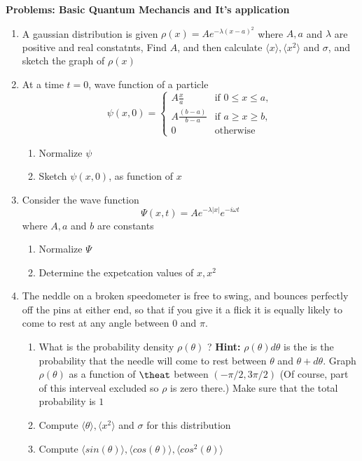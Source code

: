 \documentclass{article}[12pt, a4paper]
\begin{document}
\begin{center}
	\textbf{Problems: Basic Quantum Mechancis and It's application}
\end{center}
\begin{enumerate}

\item A gaussian distribution is given $\rho(x) = A e^{-\lambda (x - a)^2}$ where $A, a$ and $\lambda$ are positive and real constatnts, Find $A$, and then calculate $\langle x \rangle, \langle x^2 \rangle $ and $\sigma$, and sketch the graph of $\rho (x)$

\item At a time $t = 0$, wave function of a particle
$$
\psi (x, 0) =
\begin{cases}
	A \frac{x}{a} & \text{if } 0 \le x \le a, \\
	A \frac{(b - a)}{b - a} & \text{if } a \ge x \ge b, \\
	0 & \text{otherwise}

\end{cases}$$
\begin{enumerate}
	\item Normalize $\psi$
	\item Sketch $\psi(x, 0)$, as function of $x$
\end{enumerate}

\item Consider the wave function $$\Psi(x,t) = Ae^{-\lambda |x|}e^{-i\omega t}$$
where $A, a$ and $b$ are constants
\begin{enumerate}
	\item Normalize $\Psi$
	\item Determine the expetcation values of $x, x^2$
\end{enumerate}

\item The neddle on a broken speedometer is free to swing, and bounces perfectly off the pins at
either end, so that if you give it a flick it is equally likely to come to rest at any angle between $0$ and $\pi$.
\begin{enumerate}
	\item What is the probability density $\rho(\theta)$ ? \textbf{Hint:} $\rho(\theta)d\theta$ is the
	is the probability that the needle will come to rest between $\theta$ and $\theta+d\theta$.
	Graph $\rho(\theta)$ as a function of $\theat$ between $(-\pi/2, 3\pi/2)$ (Of course, part of this interveal excluded
	so $\rho$ is zero there.) Make sure that the total probability is $1$
	\item Compute $\langle \theta \rangle, \langle x^2 \rangle$ and $\sigma$ for this distribution
	\item Compute $\langle sin(\theta) \rangle, \langle cos(\theta) \rangle, \langle cos^2(\theta) \rangle$
\end{enumerate}
\end{enumerate}
\end{document}
